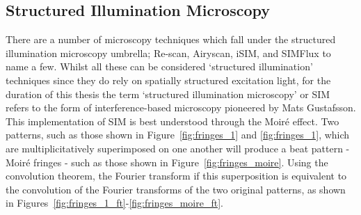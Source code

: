\subsection{Structured Illumination Microscopy}
\label{subsec:SIM}

There are a number of microscopy techniques which fall under the structured
illumination microscopy umbrella; Re-scan\cite{de2013re}, 
Airyscan\cite{huff2015airyscan}, iSIM\cite{york2013instant,curd2015construction},
and SIMFlux\cite{cnossen2020localization} to name a few. Whilst all these can be 
considered `structured illumination' techniques since they do rely on spatially 
structured excitation light, for the duration of this thesis the term 
`structured illumination microscopy' or SIM refers to the form of 
interference-based microscopy pioneered by Mats 
Gustafsson\cite{gustafsson1999extended,gustafsson2000surpassing,gustafsson2008three}.
This implementation of SIM is best understood through the Moir\'{e} effect.
Two patterns, such as those shown in Figure~\ref{fig:fringes_1} and 
\ref{fig:fringes_1}, which are multiplicitatively superimposed on one another
will produce a beat pattern - Moir\'{e} fringes - such as those shown in
Figure~\ref{fig:fringes_moire}. Using the convolution theorem, the Fourier
transform if this superposition is equivalent to the convolution of the 
Fourier transforms of the two original patterns\cite{mcgillem1991continuous},
as shown in Figures~\ref{fig:fringes_1_ft}-\ref{fig:fringes_moire_ft}. 


